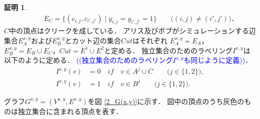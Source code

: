 \documentclass[12pt]{thesis}
\newcommand{\Izumi}[1]{\textcolor{blue}{(#1)}}
\theoremstyle{definition}
\newtheorem*{prf*}{証明}
\begin{document}
\begin{prf*}
\begin{align*}
&\phantom{=} \quad E_{C} = \{(c_{i,j}, c_{i',j'}) \mid y_{i,j}=y_{i',j'}=1\} \quad \quad \text{($(i, j) \neq (i', j')$)}．
\end{align*}
$C$中の頂点はクリークを成している．
アリス及びボブがシミュレーションする辺集合$E^{x,y}_A$および$E^{x,y}_B$とカット辺の集合$Cut$はそれぞれ
$E^{x,y}_{A} = E_{A}$，$E^{x,y}_{B} = E_{B} \cup E_{C}$，$Cut = E^{1} \cup E^{2}$と定める．
独立集合のためのラベリング$I^{x,y}$は以下のように定める．
\Izumi{(独立集合のためのラベリング$I^{x,y}$も同じように定義)}．
\begin{align*}
I^{x,y}(v) &= 0 \quad if \quad v \in A^{j} \cup C \quad \quad \text{($j \in \{1, 2\}$)}, \\
I^{x,y}(v) &= 1 \quad if \quad v \in B^{j} \quad \quad \text{($j \in \{1, 2\}$)}.
\end{align*}

グラフ$G^{x, y} = (V^{x,y}, E^{x,y})$を図 \ref{2_G(x,y)}に示す．
図中の頂点のうち灰色のものは独立集合に含まれる頂点を表す．


\end{prf*}
\end{document}
